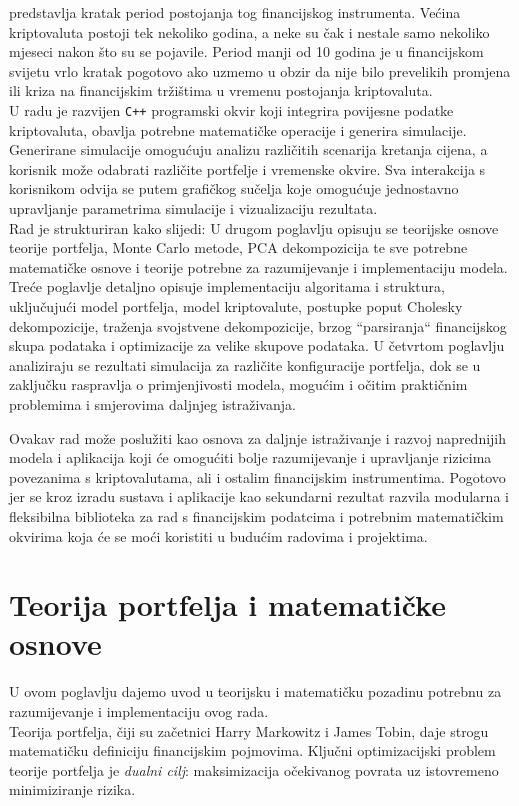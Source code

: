 \documentclass[zavrsnirad, upload]{fer}
\begin{document}
predstavlja kratak period postojanja tog financijskog instrumenta.
Većina kriptovaluta postoji tek nekoliko godina, a neke su čak i
nestale samo nekoliko mjeseci nakon što su se pojavile. Period manji od
10 godina je u financijskom svijetu vrlo kratak pogotovo ako uzmemo u obzir
da nije bilo prevelikih promjena ili kriza na financijskim tržištima
u vremenu postojanja kriptovaluta.\\
U radu je razvijen \texttt{C++} programski okvir koji integrira povijesne podatke
kriptovaluta, obavlja potrebne matematičke operacije i generira simulacije.
Generirane simulacije omogućuju analizu različitih scenarija kretanja cijena,
a korisnik može odabrati različite portfelje i vremenske okvire.
Sva interakcija s korisnikom odvija se putem grafičkog sučelja koje
omogućuje jednostavno upravljanje parametrima simulacije i vizualizaciju
rezultata.\\
Rad je strukturiran kako slijedi: U drugom poglavlju opisuju se teorijske
osnove teorije portfelja, Monte Carlo metode, PCA dekompozicija te
sve potrebne matematičke osnove i teorije potrebne za razumijevanje
i implementaciju modela.
Treće poglavlje detaljno opisuje implementaciju algoritama i struktura, uključujući
model portfelja, model kriptovalute, postupke poput Cholesky dekompozicije,
traženja svojstvene dekompozicije, brzog ``parsiranja`` financijskog skupa podataka
i optimizacije za velike skupove podataka.
U četvrtom poglavlju analiziraju se rezultati simulacija za različite
konfiguracije portfelja, dok se u zaključku raspravlja o primjenjivosti
modela, mogućim i očitim praktičnim problemima i smjerovima daljnjeg istraživanja.

Ovakav rad može poslužiti kao osnova za daljnje istraživanje i razvoj
naprednijih modela i aplikacija koji će omogućiti bolje razumijevanje i upravljanje
rizicima povezanima s kriptovalutama, ali i ostalim financijskim instrumentima.
Pogotovo jer se kroz izradu sustava i aplikacije kao sekundarni rezultat
razvila modularna i fleksibilna biblioteka za rad s financijskim podatcima i
potrebnim matematičkim okvirima koja će se moći koristiti u budućim radovima i
projektima.

\chapter{Teorija portfelja i matematičke osnove}
\label{pog:teorija_portelja}
U ovom poglavlju dajemo uvod u teorijsku i matematičku pozadinu potrebnu za
razumijevanje i implementaciju ovog rada.\\
Teorija portfelja, čiji su začetnici Harry Markowitz i James Tobin,
daje strogu matematičku definiciju financijskim pojmovima.
Ključni optimizacijski problem teorije portfelja je
\textit{dualni cilj}: maksimizacija očekivanog povrata
uz istovremeno minimiziranje rizika.
\end{document}
